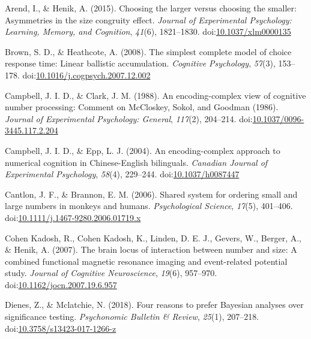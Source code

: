 \documentclass[english,,man]{apa6}
\theoremstyle{definition}
\theoremstyle{definition}
\theoremstyle{definition}
\theoremstyle{remark}
\begin{document}
\leavevmode\hypertarget{ref-arend2015}{}%
Arend, I., \& Henik, A. (2015). Choosing the larger versus choosing the
smaller: Asymmetries in the size congruity effect. \emph{Journal of
Experimental Psychology: Learning, Memory, and Cognition}, \emph{41}(6),
1821--1830.
doi:\href{https://doi.org/10.1037/xlm0000135}{10.1037/xlm0000135}

\leavevmode\hypertarget{ref-brown2008}{}%
Brown, S. D., \& Heathcote, A. (2008). The simplest complete model of
choice response time: Linear ballistic accumulation. \emph{Cognitive
Psychology}, \emph{57}(3), 153--178.
doi:\href{https://doi.org/10.1016/j.cogpsych.2007.12.002}{10.1016/j.cogpsych.2007.12.002}

\leavevmode\hypertarget{ref-campbell1988}{}%
Campbell, J. I. D., \& Clark, J. M. (1988). An encoding-complex view of
cognitive number processing: Comment on McCloskey, Sokol, and Goodman
(1986). \emph{Journal of Experimental Psychology: General},
\emph{117}(2), 204--214.
doi:\href{https://doi.org/10.1037/0096-3445.117.2.204}{10.1037/0096-3445.117.2.204}

\leavevmode\hypertarget{ref-campbell2004}{}%
Campbell, J. I. D., \& Epp, L. J. (2004). An encoding-complex approach
to numerical cognition in Chinese-English bilinguals. \emph{Canadian
Journal of Experimental Psychology}, \emph{58}(4), 229--244.
doi:\href{https://doi.org/10.1037/h0087447}{10.1037/h0087447}

\leavevmode\hypertarget{ref-cantlon2006}{}%
Cantlon, J. F., \& Brannon, E. M. (2006). Shared system for ordering
small and large numbers in monkeys and humans. \emph{Psychological
Science}, \emph{17}(5), 401--406.
doi:\href{https://doi.org/10.1111/j.1467-9280.2006.01719.x}{10.1111/j.1467-9280.2006.01719.x}

\leavevmode\hypertarget{ref-cohenKadosh2007}{}%
Cohen Kadosh, R., Cohen Kadosh, K., Linden, D. E. J., Gevers, W.,
Berger, A., \& Henik, A. (2007). The brain locus of interaction between
number and size: A combined functional magnetic resonance imaging and
event-related potential study. \emph{Journal of Cognitive Neuroscience},
\emph{19}(6), 957--970.
doi:\href{https://doi.org/10.1162/jocn.2007.19.6.957}{10.1162/jocn.2007.19.6.957}

\leavevmode\hypertarget{ref-dienes2018}{}%
Dienes, Z., \& Mclatchie, N. (2018). Four reasons to prefer Bayesian
analyses over significance testing. \emph{Psychonomic Bulletin \&
Review}, \emph{25}(1), 207--218.
doi:\href{https://doi.org/10.3758/s13423-017-1266-z}{10.3758/s13423-017-1266-z}
\end{document}
